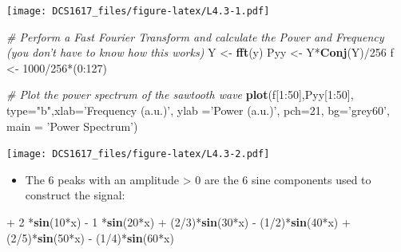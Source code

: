 \documentclass[]{book}
\newenvironment{Shaded}{\begin{snugshade}}{\end{snugshade}}
\newcommand{\KeywordTok}[1]{\textcolor[rgb]{0.13,0.29,0.53}{\textbf{{#1}}}}
\newcommand{\DataTypeTok}[1]{\textcolor[rgb]{0.13,0.29,0.53}{{#1}}}
\newcommand{\DecValTok}[1]{\textcolor[rgb]{0.00,0.00,0.81}{{#1}}}
\newcommand{\StringTok}[1]{\textcolor[rgb]{0.31,0.60,0.02}{{#1}}}
\newcommand{\CommentTok}[1]{\textcolor[rgb]{0.56,0.35,0.01}{\textit{{#1}}}}
\newcommand{\NormalTok}[1]{{#1}}
\providecommand{\tightlist}{%
  \setlength{\itemsep}{0pt}\setlength{\parskip}{0pt}}
\begin{document}
\texttt{[image: DCS1617\_files/figure-latex/L4.3-1.pdf]}

\begin{Shaded}
\begin{Highlighting}[]
\CommentTok{# Perform a Fast Fourier Transform and calculate the Power and Frequency (you don't have to know how this works)}
\NormalTok{Y   <-}\StringTok{ }\KeywordTok{fft}\NormalTok{(y)}
\NormalTok{Pyy <-}\StringTok{ }\NormalTok{Y*}\KeywordTok{Conj}\NormalTok{(Y)/}\DecValTok{256}
\NormalTok{f <-}\StringTok{ }\DecValTok{1000}\NormalTok{/}\DecValTok{256}\NormalTok{*(}\DecValTok{0}\NormalTok{:}\DecValTok{127}\NormalTok{)}

\CommentTok{# Plot the power spectrum of the sawtooth wave}
\KeywordTok{plot}\NormalTok{(f[}\DecValTok{1}\NormalTok{:}\DecValTok{50}\NormalTok{],Pyy[}\DecValTok{1}\NormalTok{:}\DecValTok{50}\NormalTok{], }\DataTypeTok{type=}\StringTok{"b"}\NormalTok{,}\DataTypeTok{xlab=}\StringTok{'Frequency (a.u.)'}\NormalTok{, }\DataTypeTok{ylab =}\StringTok{'Power (a.u.)'}\NormalTok{, }\DataTypeTok{pch=}\DecValTok{21}\NormalTok{, }\DataTypeTok{bg=}\StringTok{'grey60'}\NormalTok{, }\DataTypeTok{main =} \StringTok{'Power Spectrum'}\NormalTok{)}
\end{Highlighting}
\end{Shaded}

\texttt{[image: DCS1617\_files/figure-latex/L4.3-2.pdf]}

\begin{itemize}
\tightlist
\item
  The \(6\) peaks with an amplitude \textgreater{} \(0\) are the \(6\)
  sine components used to construct the signal:
\end{itemize}

\begin{Shaded}
\begin{Highlighting}[]
\NormalTok{+}\StringTok{   }\DecValTok{2}  \NormalTok{*}\KeywordTok{sin}\NormalTok{(}\DecValTok{10}\NormalTok{*x) }
\NormalTok{-}\StringTok{   }\DecValTok{1}  \NormalTok{*}\KeywordTok{sin}\NormalTok{(}\DecValTok{20}\NormalTok{*x) }
\NormalTok{+}\StringTok{ }\NormalTok{(}\DecValTok{2}\NormalTok{/}\DecValTok{3}\NormalTok{)*}\KeywordTok{sin}\NormalTok{(}\DecValTok{30}\NormalTok{*x) }
\NormalTok{-}\StringTok{ }\NormalTok{(}\DecValTok{1}\NormalTok{/}\DecValTok{2}\NormalTok{)*}\KeywordTok{sin}\NormalTok{(}\DecValTok{40}\NormalTok{*x) }
\NormalTok{+}\StringTok{ }\NormalTok{(}\DecValTok{2}\NormalTok{/}\DecValTok{5}\NormalTok{)*}\KeywordTok{sin}\NormalTok{(}\DecValTok{50}\NormalTok{*x) }
\NormalTok{-}\StringTok{ }\NormalTok{(}\DecValTok{1}\NormalTok{/}\DecValTok{4}\NormalTok{)*}\KeywordTok{sin}\NormalTok{(}\DecValTok{60}\NormalTok{*x)}
\end{Highlighting}
\end{Shaded}
\end{document}
